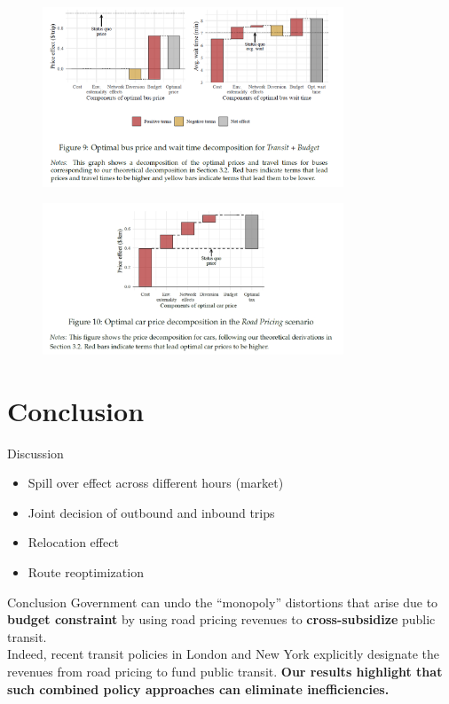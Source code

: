 \documentclass[10pt, aspectratio=169]{beamer}
\begin{document}
\begin{frame}
  \begin{figure}
    \centering
    \includegraphics[width=0.8\textwidth]{../Figures/transit_budget.png}
  \end{figure}
\end{frame}

\begin{frame}
  \begin{figure}
    \centering
    \includegraphics[width=0.8\textwidth]{../Figures/road_budget.png}
  \end{figure}
\end{frame}

\section{Conclusion}
\begin{frame}{Discussion}
  \begin{itemize}
    \item Spill over effect across different hours (market)
    \item Joint decision of outbound and inbound trips
    \item Relocation effect
    \item Route reoptimization
  \end{itemize}
\end{frame}
\begin{frame}{Conclusion}
  Government can undo the “monopoly” distortions that arise due to \textbf{budget constraint} by using road pricing revenues to \textbf{cross-subsidize} public transit.\\
  Indeed, recent transit policies in London and New York explicitly designate the revenues from road pricing to fund public transit. \textbf{Our results highlight that such
    combined policy approaches can eliminate inefficiencies.}

\end{frame}
\end{document}
